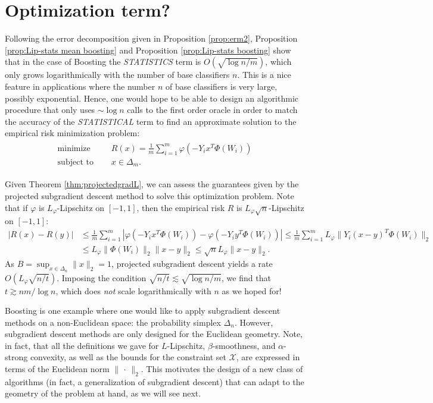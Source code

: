 \section{Optimization term?}
Following the error decomposition given in Proposition \ref{prop:erm2}, Proposition \ref{prop:Lip-stats mean boosting} and Proposition \ref{prop:Lip-stats boosting} show that in the case of Boosting the \emph{STATISTICS} term is $O(\sqrt{\log n/m})$, which only grows logarithmically with the number of base classifiers $n$. This is a nice feature in applications where the number $n$ of base classifiers is very large, possibly exponential.
Hence, one would hope to be able to design an algorithmic procedure that only uses $\sim\log n$ calls to the first order oracle in order to match the accuracy of the \emph{STATISTICAL} term to find an approximate solution to the empirical risk minimization problem:
\begin{align*}
	\begin{aligned}
		\text{minimize }\quad   & R(x) = \frac{1}{m} \sum_{i=1}^m \varphi(-Y_ix^T\Phi(W_i))\\
		\text{subject to }\quad & x\in \Delta_m.
	\end{aligned}
\end{align*}

Given Theorem \ref{thm:projectedgradL}, we can assess the guarantees given by the projected subgradient descent method to solve this optimization problem. Note that if $\varphi$ is $L_\varphi$-Lipschitz on $[-1,1]$, then the empirical risk $R$ is $L_\varphi\sqrt{n}$-Lipschitz on $[-1,1]$:
\begin{align*}
	|R(x)-R(y)| 
	&\le \frac{1}{m} \sum_{i=1}^m | \varphi(-Y_ix^T\Phi(W_i)) - \varphi(-Y_iy^T\Phi(W_i)) |
	\le 
	\frac{1}{m} \sum_{i=1}^m L_\varphi \| Y_i(x-y)^T\Phi(W_i) \|_2\\
	&\le L_\varphi \| \Phi(W_i) \|_2 \| x-y \|_2
	\le \sqrt{n}L_\varphi \| x-y \|_2.
\end{align*}
As $B=\sup_{x\in\Delta_n}\|x\|_2=1$, projected subgradient descent yields a rate $O(L_\varphi\sqrt{n/t})$. Imposing the condition $\sqrt{n/t} \lesssim \sqrt{\log n/m}$, we find that $t\gtrsim nm/\log n$, which does \emph{not} scale logarithmically with $n$ as we hoped for!

Boosting is one example where one would like to apply subgradient descent methods on a non-Euclidean space: the probability simplex $\Delta_n$. However, subgradient descent methods are only designed for the Euclidean geometry. Note, in fact, that all the definitions we gave for $L$-Lipschitz, $\beta$-smoothness, and $\alpha$-strong convexity, as well as the bounds for the constraint set $\mathcal{X}$, are expressed in terms of the Euclidean norm $\|\,\cdot\,\|_2$. This motivates the design of a new class of algorithms (in fact, a generalization of subgradient descent) that can adapt to the geometry of the problem at hand, as we will see next.
